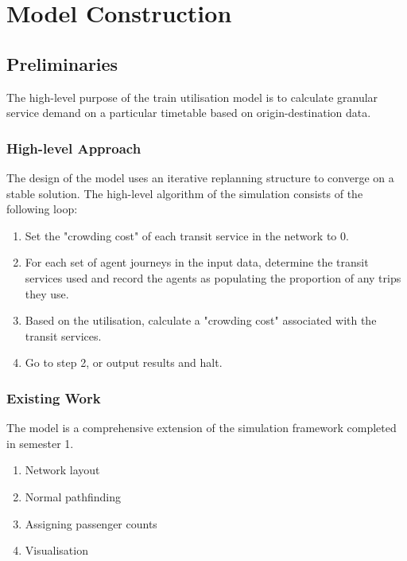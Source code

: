 \chapter{Model Construction}
\label{chap:ModelConstruction}

\section{Preliminaries}
The high-level purpose of the train utilisation model is to calculate granular service demand on a particular timetable based on origin-destination data.


\subsection{High-level Approach}
The design of the model uses an iterative replanning structure to converge on a stable solution. The high-level algorithm of the simulation consists of the following loop:
\begin{SingleSpacing}
    \begin{enumerate}
        \item Set the "crowding cost" of each transit service in the network to 0.
        \item For each set of agent journeys in the input data, determine the transit services used and record the agents as populating the proportion of any trips they use.
        \item Based on the utilisation, calculate a "crowding cost" associated with the transit services.
        \item Go to step 2, or output results and halt.
    \end{enumerate}
\end{SingleSpacing}

\subsection{Existing Work}
The model is a comprehensive extension of the simulation framework completed in semester 1.

\begin{SingleSpacing}
    \begin{enumerate}
        \item Network layout
        \item Normal pathfinding
        \item Assigning passenger counts
        \item Visualisation
    \end{enumerate}
\end{SingleSpacing}

